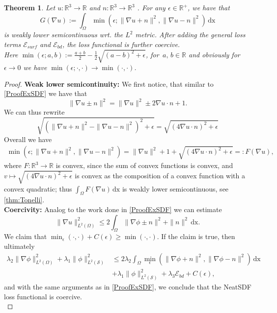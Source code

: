 \documentclass[12pt,openany]{book}
\newcommand{\R}{\mathbb{R}}
\def\S{\mathcal{S}}
\theoremstyle{plainnormal}
\newtheorem{theorem}{Theorem}[section]
\theoremstyle{remark}
\begin{document}
\begin{theorem}\label{min_lsc}
    Let $u:\R^3\rightarrow\R$ and $n: \R^3\rightarrow\R^3$ . For any $\epsilon \in \R^+$, we have that $$G(\nabla u) := \int_\Omega \min (\epsilon; \|\nabla u+ n\|^2,\|\nabla u - n\|^2)\,\mathrm{dx}$$ is weakly lower semicontinuous wrt.  the $L^2$ metric. After adding the general loss terms $\mathcal{E}_{surf}$ and $\mathcal{E}_{bd}$, the loss functional is further coercive.\\
    Here $\min(\epsilon;a,b) := \frac{a + b}{2} - \frac{1}{2}\sqrt{(a-b)^2 + \epsilon}$, for $\,a,\,b \in \R$ and obviously for $\epsilon  \rightarrow 0$ we have $\min(\epsilon; \cdot, \cdot) \rightarrow \min(\cdot, \cdot)$. 
\end{theorem}
\begin{proof}
\textbf{Weak lower semicontinuity:} We first notice, that similar to \cref{ProofExSDF} we have that $$\|\nabla u \pm n\|^2 = \|\nabla u\|^2 \pm 2 \nabla u \cdot n + 1.$$
    We can thus rewrite $$\sqrt{(\|\nabla u + n\|^2 - \|\nabla u - n\|^2)^2 + \epsilon} = \sqrt{(4 \nabla u\cdot n)^2 + \epsilon}$$
    Overall we have \begin{align*}
        \min (\epsilon; \|\nabla u+ n\|^2,\|\nabla u - n\|^2) = \|\nabla u\|^2 + 1 + \sqrt{(4 \nabla u\cdot n)^2 + \epsilon}=: F(\nabla u), 
    \end{align*}
    where $F :\R^3 \rightarrow\R$ is convex, since the sum of convex functions is convex, and $v\mapsto\sqrt{(4 \nabla u\cdot n)^2 + \epsilon}$ is convex as the composition of a convex function with a convex quadratic; thus $\int_\Omega F(\nabla u)\, \mathrm{dx}$ is weakly lower semicontinuous, see \cref{thm:Tonelli}.\\
    \textbf{Coercivity:} Analog to the work done in \cref{ProofExSDF} we can estimate $$\|\nabla u\|^2_{L^2(\Omega)} \leq 2 \int_\Omega \|\nabla \phi \pm n\|^2 + \|n\|^2\,\mathrm{dx}.$$
    We claim that $\min_\epsilon(\cdot, \cdot) + C(\epsilon) \geq \min(\cdot, \cdot)$. If the claim is true, then ultimately 
    \begin{align*}
    \lambda_2\|\nabla \phi\| ^2_{L^2(\Omega)} + \lambda_1 \|\phi\| ^2_{L^2(\S)}
 &\leq 2 \lambda_2\int_\Omega\min_\epsilon(\|\nabla \phi + n\|^2, \|\nabla \phi - n\|^2) \,\mathrm{dx} \\ 
 &+ \lambda_1 \|\phi\| ^2_{L^2(\S)} + \lambda_3 \mathcal{E}_{bd} + C(\epsilon),
\end{align*} 
and with the same arguments as in \cref{ProofExSDF}, we conclude that the NeatSDF loss functional is coercive.\\

\end{proof}
\end{document}
